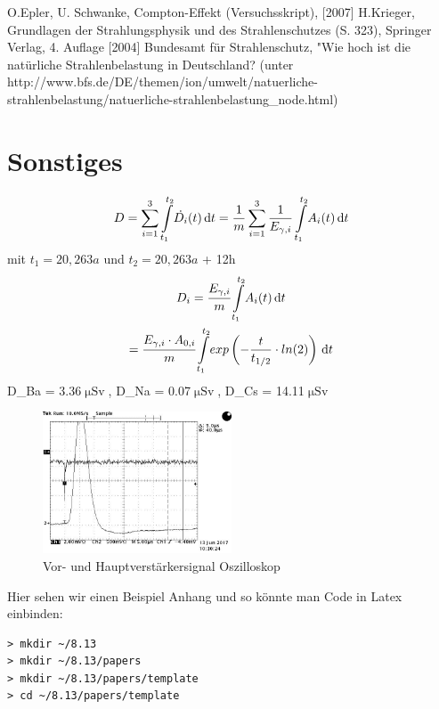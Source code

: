 \documentclass[aps,twocolumn,secnumarabic,nobalancelastpage,amsmath,amssymb,
nofootinbib,superscriptaddress]{revtex4-1}
\begin{document}


\begin{thebibliography}{99}
O.Epler, U. Schwanke, Compton-Effekt (Versuchsskript),  [2007]
H.Krieger, Grundlagen der Strahlungsphysik und des Strahlenschutzes (S. 323), Springer Verlag, 4. Auflage [2004]
Bundesamt für Strahlenschutz, "Wie hoch ist die natürliche Strahlenbelastung in Deutschland?\grqq\: (unter http://www.bfs.de/DE/themen/ion/umwelt/natuerliche-strahlenbelastung/natuerliche-strahlenbelastung_node.html)
\end{thebibliography}


\clearpage
\appendix

\section{Sonstiges}

\begin{equation}
  D = \sum\limits_{i=1}^3 \int\limits_{t_1}^{t_2} \! \dot{D_i}(t) \, \mathrm{d}t = \frac{1}{m}\sum\limits_{i=1}^3
  \frac{1}{E_{\gamma,i}} \int\limits_{t_1}^{t_2} \! A_{i}(t) \, \mathrm{d}t  \newline
\end{equation}
mit $t_1 = 20,263a$ und $t_2 = 20,263a$ + 12h
\begin{equation}
  \begin{gathered}
    D_i = \cfrac{E_{\gamma,i}}{m} \int\limits_{t_1}^{t_2} \! A_i(t) \, \mathrm{d}t \\
    = \cfrac{E_{\gamma,i}\cdot A_{0,i}}{m} \int\limits_{t_1}^{t_2} \! exp\left(-\frac{t}{t_{1/2}}\cdot ln(2)\right) \, \mathrm{d}t
  \end{gathered}
\end{equation}
\Rightarrow D_{Ba} = 3.36\:$\upmu\text{Sv}$,\: D_{Na} = 0.07\:$\upmu\text{Sv}$,\: D_{Cs} = 14.11\:$\upmu\text{Sv}$
\vspace{3em}

\begin{figure}[h]
  \centering
  \includegraphics[width=0.5\textwidth]{../Messung/OsziVerstaerkerkurve/TEK00009.jpg}
  \caption{\label{fig:aufbau} Vor- und Hauptverstärkersignal Oszilloskop}
\end{figure}

Hier sehen wir einen Beispiel Anhang und so könnte man Code in Latex einbinden:
\begin{verbatim}
> mkdir ~/8.13
> mkdir ~/8.13/papers
> mkdir ~/8.13/papers/template
> cd ~/8.13/papers/template
\end{verbatim}


\end{document}
